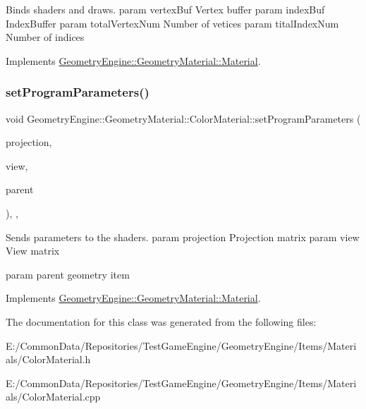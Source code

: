 Binds shaders and draws. param vertex\+Buf Vertex buffer param index\+Buf Index\+Buffer param total\+Vertex\+Num Number of vetices param tital\+Index\+Num Number of indices 

Implements \mbox{\hyperlink{class_geometry_engine_1_1_geometry_material_1_1_material_a0070eab6e5fe86dc05dc69f2e37b9072}{Geometry\+Engine\+::\+Geometry\+Material\+::\+Material}}.

\mbox{\label{class_geometry_engine_1_1_geometry_material_1_1_color_material_afc9bcbd2091f6592dfb8a6ace1d4adfb}} 
\subsubsection{\texorpdfstring{setProgramParameters()}{setProgramParameters()}}
{\footnotesize\ttfamily void Geometry\+Engine\+::\+Geometry\+Material\+::\+Color\+Material\+::set\+Program\+Parameters (\begin{DoxyParamCaption}\item[{const Q\+Matrix4x4 \&}]{projection,  }\item[{const Q\+Matrix4x4 \&}]{view,  }\item[{const \mbox{\hyperlink{class_geometry_engine_1_1_geometry_world_item_1_1_geometry_item_1_1_geometry_item}{Geometry\+World\+Item\+::\+Geometry\+Item\+::\+Geometry\+Item}} \&}]{parent }\end{DoxyParamCaption})\hspace{0.3cm}{\ttfamily [override]}, {\ttfamily [protected]}, {\ttfamily [virtual]}}

Sends parameters to the shaders. param projection Projection matrix param view View matrix

param parent geometry item 

Implements \mbox{\hyperlink{class_geometry_engine_1_1_geometry_material_1_1_material_a68310797df53062f237d0005fbcfce7e}{Geometry\+Engine\+::\+Geometry\+Material\+::\+Material}}.



The documentation for this class was generated from the following files\+:\begin{DoxyCompactItemize}
\item 
E\+:/\+Common\+Data/\+Repositories/\+Test\+Game\+Engine/\+Geometry\+Engine/\+Items/\+Materials/Color\+Material.\+h\item 
E\+:/\+Common\+Data/\+Repositories/\+Test\+Game\+Engine/\+Geometry\+Engine/\+Items/\+Materials/Color\+Material.\+cpp\end{DoxyCompactItemize}
